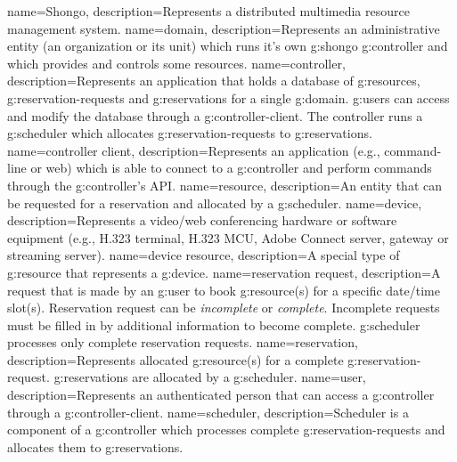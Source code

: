 {
  name=Shongo,
  description={Represents a distributed multimedia resource management system.}
}
{
  name=domain,
  description={Represents an administrative entity (an organization or its unit) which runs it's own \gls{g:shongo} \gls{g:controller} and which provides and controls some resources.}
}
{
  name=controller,
  description={Represents an application that holds a database of 
    \glspl{g:resource}, \glspl{g:reservation-request} and \glspl{g:reservation} 
    for a single \gls{g:domain}. \Glspl{g:user} can access and modify the database 
    through a \gls{g:controller-client}. The controller runs a \gls{g:scheduler}
    which allocates \glspl{g:reservation-request} to \glspl{g:reservation}.}
}
{
  name=controller client,
  description={Represents an application (e.g., command-line or web) which is able to
    connect to a \gls{g:controller} and perform commands through the \gls{g:controller}'s API.}
}
{
  name=resource,
  description={An entity that can be requested for a reservation and allocated 
  by a \gls{g:scheduler}.}
}
{
  name=device,
  description={Represents a video/web conferencing hardware or software equipment
   (e.g., H.323 terminal, H.323 MCU, Adobe Connect server, gateway or streaming server).}
}
{
  name=device resource,
  description={A special type of \gls{g:resource} that represents a \gls{g:device}.}
}
{
  name=reservation request,
  description={A request that is made by an \gls{g:user} to book \gls{g:resource}(s)
    for a specific date/time slot(s). Reservation request can be \emph{incomplete} 
    or \emph{complete}. Incomplete requests must be filled in by 
    additional information to become complete. \Gls{g:scheduler} processes only 
    complete reservation requests.}
}
{
  name=reservation,
  description={Represents allocated \gls{g:resource}(s) for a complete 
    \gls{g:reservation-request}. \Glspl{g:reservation} are allocated by a \gls{g:scheduler}.}
}
{
  name=user,
  description={Represents an authenticated person that can access a \gls{g:controller} 
    through a \gls{g:controller-client}.}
}
{
  name=scheduler,
  description={Scheduler is a component of a \gls{g:controller} which processes 
    complete \glspl{g:reservation-request} and allocates them to \glspl{g:reservation}.}
}
